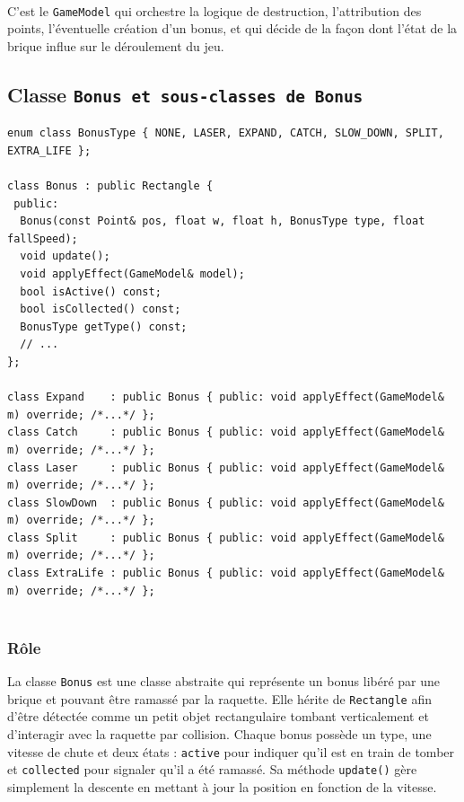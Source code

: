 \documentclass[12pt]{article}
\begin{document}
\paragraph{}
C’est le \colorbox{gray!20}{\texttt{GameModel}} qui orchestre la logique de destruction, l’attribution des points, l’éventuelle création d’un bonus, et qui décide de la façon dont l’état de la brique influe sur le déroulement du jeu.





\subsection{Classe \texttt{Bonus et sous-classes de Bonus}}\textbf{}


\begin{lstlisting}
enum class BonusType { NONE, LASER, EXPAND, CATCH, SLOW_DOWN, SPLIT, EXTRA_LIFE };

class Bonus : public Rectangle {
 public:
  Bonus(const Point& pos, float w, float h, BonusType type, float fallSpeed);
  void update();
  void applyEffect(GameModel& model);
  bool isActive() const;
  bool isCollected() const;
  BonusType getType() const;
  // ...
};

class Expand    : public Bonus { public: void applyEffect(GameModel& m) override; /*...*/ };
class Catch     : public Bonus { public: void applyEffect(GameModel& m) override; /*...*/ };
class Laser     : public Bonus { public: void applyEffect(GameModel& m) override; /*...*/ };
class SlowDown  : public Bonus { public: void applyEffect(GameModel& m) override; /*...*/ };
class Split     : public Bonus { public: void applyEffect(GameModel& m) override; /*...*/ };
class ExtraLife : public Bonus { public: void applyEffect(GameModel& m) override; /*...*/ };


\end{lstlisting}

\newpage

\subsubsection* {Rôle}


La classe \colorbox{gray!20}{\texttt{Bonus}} est une classe abstraite qui représente un bonus libéré par une brique et pouvant être ramassé par la raquette. Elle hérite de \colorbox{gray!20}{\texttt{Rectangle}} afin d’être détectée comme un petit objet rectangulaire tombant verticalement et d’interagir avec la raquette par collision. Chaque bonus possède un type, une vitesse de chute et deux états : \colorbox{gray!20}{\texttt{active}} pour indiquer qu’il est en train de tomber et \colorbox{gray!20}{\texttt{collected}} pour signaler qu’il a été ramassé. Sa méthode \colorbox{gray!20}{\texttt{update()}} gère simplement la descente en mettant à jour la position en fonction de la vitesse.
\end{document}
